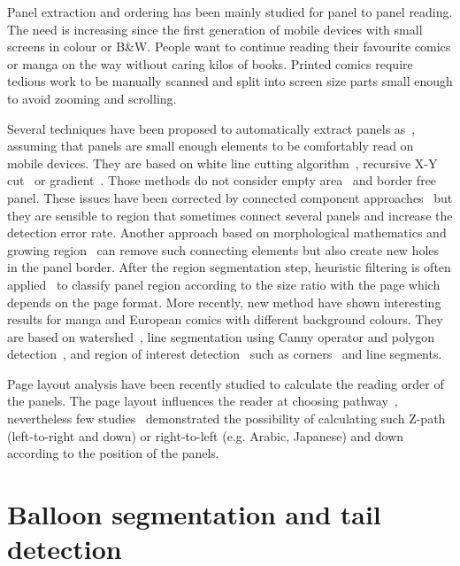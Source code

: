 Panel extraction and ordering has been mainly studied for panel to panel reading.
The need is increasing since the first generation of mobile devices with small screens in colour or B\&W.
People want to continue reading their favourite comics or manga on the way without caring kilos of books.
Printed comics require tedious work to be manually scanned and split into screen size parts small enough to avoid zooming and scrolling.

Several techniques have been proposed to automatically extract panels as~\cite{In11}, assuming that panels are small enough elements to be comfortably read on mobile devices.
They are based on white line cutting algorithm~\cite{Duda72,li2012automatic,Chan2007Automatic}, recursive X-Y cut~\cite{Han07} or gradient~\cite{Tan07}.
Those methods do not consider empty area~\cite{In11} and border free panel.
These issues have been corrected by connected component approaches~\cite{Arai10} 
but they are sensible to region that sometimes connect several panels and increase the detection error rate.
Another approach based on morphological mathematics and growing region~\cite{Khoi11} can remove such connecting elements but also create new holes in the panel border.
After the region segmentation step, heuristic filtering is often applied~\cite{Arai11,Khoi11} to classify panel region according to the size ratio with the page which depends on the page format.
More recently, new method have shown interesting results for manga and European comics with different background colours.
They are based on watershed~\cite{ponsard2012ocr}, line segmentation using Canny operator and polygon detection~\cite{Luyuan2014Automatic}, and region of interest detection~\cite{stommel2012segmentation} such as corners~\cite{Tsai2013Adaptive} and line segments.

Page layout analysis have been recently studied to calculate the reading order of the panels.
The page layout influences the reader at choosing pathway~\cite{Cohn_2013}, nevertheless few studies~\cite{Guerin2012Ontologies,Ponsard09,Arai2010Automatic} demonstrated the possibility of calculating such Z-path (left-to-right and down) or right-to-left (e.g. Arabic, Japanese) and down~\cite{Li2013Comic,Tsai2013Adaptive} according to the position of the panels. 

\section{Balloon segmentation and tail detection}
\label{sec:sota:balloon_segmentation}

